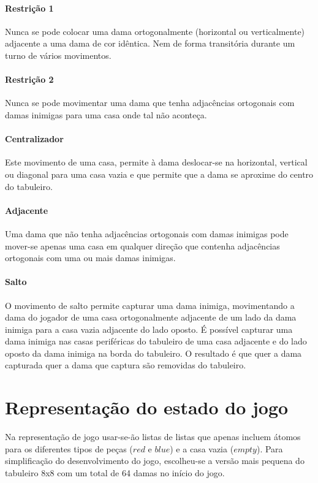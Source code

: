 \documentclass[a4paper,11pt,titlepage]{article}
\begin{document}
\paragraph{Restrição 1}
Nunca se pode colocar uma dama ortogonalmente (horizontal ou verticalmente) adjacente a uma dama de cor idêntica. Nem de forma transitória durante um turno de vários movimentos.

\paragraph{Restrição 2}
Nunca se pode movimentar uma dama que tenha adjacências ortogonais com damas inimigas para uma casa onde tal não aconteça.

\paragraph{Centralizador}
Este movimento de uma casa, permite à dama deslocar-se na horizontal, vertical ou diagonal para uma casa vazia e que permite que a dama se aproxime do centro do tabuleiro.


\paragraph{Adjacente}
Uma dama que não tenha adjacências ortogonais com damas inimigas pode mover-se apenas uma casa em qualquer direção que contenha adjacências ortogonais com uma ou mais damas inimigas.

\paragraph{Salto}
O movimento de salto permite capturar uma dama inimiga, movimentando a dama do jogador de uma casa ortogonalmente adjacente de um lado da dama inimiga para a casa vazia adjacente do lado oposto. É possível capturar uma dama inimiga nas casas periféricas do tabuleiro de uma casa adjacente e do lado oposto da dama inimiga na borda do tabuleiro. O resultado é que quer a dama capturada quer a dama que captura são removidas do tabuleiro.

\section{Representação do estado do jogo}

Na representação de jogo usar-se-ão listas de listas que apenas incluem
átomos para os diferentes tipos de peças ($red$ e $blue$) e a casa vazia ($empty$). Para simplificação do desenvolvimento do jogo, escolheu-se a versão mais pequena do tabuleiro 8x8 com um total de 64 damas no início do jogo.
\end{document}
